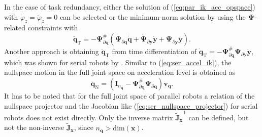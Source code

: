 \documentclass[a4paper,twoside]{article}
\begin{document}
In the case of task redundancy, either the solution of (\ref{eq:par_ik_acc_opspace}) with $\dot{\varphi}_z{=}\ddot{\varphi}_z{=}0$ can be selected or the minimum-norm solution by using the $\bm{\Psi}$-related constraints with
\begin{equation}
\ddot{\bm{q}}_{\mathrm{T}}=-\bm{\Psi}_{\partial \bm{q}}^{\#}
\left(
\dot{\bm{\Psi}}_{\partial \bm{q}}\dot{\bm{q}} + 
\dot{\bm{\Psi}}_{\partial \bm{y}}\dot{\bm{y}} + 
\bm{\Psi}_{\partial \bm{y}}\ddot{\bm{y}}
\right).
\label{eq:par_ik_acc_taskspace}
\end{equation}
Another approach is obtaining $\ddot{\bm{q}}_\mathrm{T}$ from time differentiation of  $\dot{\bm{q}}_{\mathrm{T}}=-\bm{\Psi}_{\partial \bm{q}}^{\#} \bm{\Psi}_{\partial \bm{y}}\dot{\bm{y}}$, which was shown for serial robots by \cite{ReiterMueGat2018}.
%
Similar to (\ref{eq:ser_accel_ik}), the nullspace motion in the full joint space on acceleration level is obtained as
\begin{equation}
\ddot{\bm{q}}_{\mathrm{N}}=(\bm{I}_{n_{\bm{q}}}-\bm{\Psi}_{\partial \bm{q}}^{\#}\bm{\Psi}_{\partial \bm{q}}) \bm{v}_{\bm{q}}.
\label{eq:par_nullspace_fulljoint}
\end{equation}
It has to be noted that for the full joint space of parallel robots a relation of the nullspace projector and the Jacobian like (\ref{eq:ser_nullspace_projector}) for serial robots does not exist directly. 
Only the inverse matrix $\tilde{\bm{J}}_{\bm{x}}^{-1}$ can be defined, but not the non-inverse $\tilde{\bm{J}}_{\bm{x}}$, since $n_{\bm{q}}>\mathrm{dim}(\bm{x})$.
\end{document}
